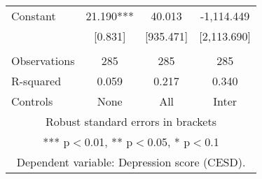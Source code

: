 \begin{tabular}{lccc}
Constant & 21.190*** & 40.013 & -1,114.449 \\
 & [0.831] & [935.471] & [2,113.690] \\
 &  &  &  \\
Observations & 285 & 285 & 285 \\
R-squared & 0.059 & 0.217 & 0.340 \\
 Controls & None & All & Inter \\ \hline
\multicolumn{4}{c}{ Robust standard errors in brackets} \\
\multicolumn{4}{c}{ *** p$<$0.01, ** p$<$0.05, * p$<$0.1} \\
\multicolumn{4}{c}{ Dependent variable: Depression score (CESD).} \\
\end{tabular}
